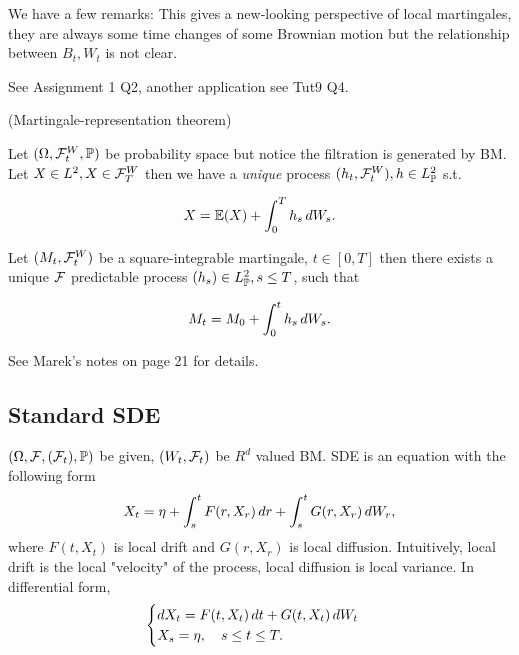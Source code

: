 We have a few remarks: This gives a new-looking perspective of local martingales, they are always some time changes of some Brownian motion but the relationship between $B_t, W_t$ is not clear.

\begin{example}
See Assignment 1 Q2, another application see Tut9 Q4.
\end{example}

\begin{thm}{(Martingale-representation theorem)}

Let $(\Omega, \mathcal{F}_t^W, \mathbb{P})$ be probability space but notice the filtration is generated by BM. Let $X\in L^{2}, X\in \mathcal{F}_T^W$ then we have a \textit{unique} process $(h_t, \mathcal{F}_t^W), h \in L_{\mathbb{P}}^{2}$ s.t.

\begin{equation*}
    X = \mathbb{E}(X)+\int_0^T h_s \mathop{}\!d W_s.
\end{equation*}
\end{thm}

\begin{lem}
Let $(M_t, \mathcal{F}_t^W)$ be a square-integrable martingale, $t\in[0,T]$ then there exists a unique $\mathcal{F}$ predictable process $(h_s) \in L_{\mathbb{P}}^{2}, s\leq T$, such that 

\begin{equation*}
    M_t = M_0 + \int_0^t h_s \mathop{}\!d W_s.
\end{equation*}
\end{lem}

See Marek's notes on page 21 for details.

\subsection{Standard SDE}

$(\Omega, \mathcal{F}, (\mathcal{F}_t), \mathbb{P})$ be given, $(W_t, \mathcal{F}_t)$ be $R^d$ valued BM. SDE is an equation with the following form
\begin{equation*}
    X_t = \eta + \int_s^t F(r,X_r) \mathop{}\!d r+\int_s^t G(r,X_r) \mathop{}\!d W_r,
\end{equation*}
where $F(t,X_t)$ is local drift and $G(r,X_r)$ is local diffusion. Intuitively, local drift is the local "velocity" of the process, local diffusion is local variance. In differential form,
\begin{equation*}
    \begin{cases}
        \mathop{}\!d X_t = F(t,X_t) \mathop{}\!d t + G(t,X_t) \mathop{}\!d W_t \\
        X_s = \eta,\quad  s\leq t \leq T.
    \end{cases}
\end{equation*}


